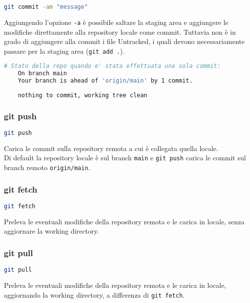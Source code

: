 \begin{lstlisting}[language=bash]
	git commit -am "message"
\end{lstlisting}
Aggiungendo l'opzione \texttt{-a} è possibile saltare la staging area e aggiungere le modifiche direttamente alla repository locale come commit. Tuttavia non è in grado di aggiungere alla commit i file Untracked, i quali devono necessariamente passare per la staging area (\texttt{git add .}).\\

\begin{lstlisting}[language=bash]
	# Stato della repo quando e' stata effettuata una sola commit: 
	On branch main
	Your branch is ahead of 'origin/main' by 1 commit.
	
	nothing to commit, working tree clean
\end{lstlisting}

\subsubsection{git push}
\begin{lstlisting}[language=bash]
	git push
\end{lstlisting}
Carica le commit sulla repository remota a cui è collegata quella locale.\\
Di default la repository locale è sul branch \texttt{main} e \texttt{git push} carica le commit sul branch remoto \texttt{origin/main}.

\subsubsection{git fetch}
\begin{lstlisting}[language=bash]
	git fetch
\end{lstlisting}
Preleva le eventuali modifiche della repository remota e le carica in locale, senza aggiornare la working directory.

\subsubsection{git pull}
\begin{lstlisting}[language=bash]
	git pull
\end{lstlisting}
Preleva le eventuali modifiche della repository remota e le carica in locale, aggiornando la working directory, a differenza di \texttt{git fetch}.\\


